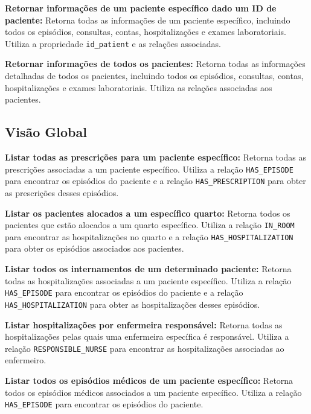 \vspace{0.15cm}
\textbf{Retornar informações de um paciente específico dado um ID de paciente:} Retorna todas as informações de um paciente específico, incluindo todos os episódios, consultas, contas, hospitalizações e exames laboratoriais. Utiliza a propriedade \texttt{id\_patient} e as relações associadas.

\vspace{0.15cm}
\textbf{Retornar informações de todos os pacientes:} Retorna todas as informações detalhadas de todos os pacientes, incluindo todos os episódios, consultas, contas, hospitalizações e exames laboratoriais. Utiliza as relações associadas aos pacientes.

\subsection{Visão Global}

\vspace{0.15cm}
\textbf{Listar todas as prescrições para um paciente específico:} Retorna todas as prescrições associadas a um paciente específico. Utiliza a relação \texttt{HAS\_EPISODE} para encontrar os episódios do paciente e a relação \texttt{HAS\_PRESCRIPTION} para obter as prescrições desses episódios.

\vspace{0.15cm}
\textbf{Listar os pacientes alocados a um específico quarto:} Retorna todos os pacientes que estão alocados a um quarto específico. Utiliza a relação \texttt{IN\_ROOM} para encontrar as hospitalizações no quarto e a relação \texttt{HAS\_HOSPITALIZATION} para obter os episódios associados aos pacientes.

\vspace{0.15cm}
\textbf{Listar todos os internamentos de um determinado paciente:} Retorna todas as hospitalizações associadas a um paciente específico. Utiliza a relação \texttt{HAS\_EPISODE} para encontrar os episódios do paciente e a relação \texttt{HAS\_HOSPITALIZATION} para obter as hospitalizações desses episódios.

\vspace{0.15cm}
\textbf{Listar hospitalizações por enfermeira responsável:} Retorna todas as hospitalizações pelas quais uma enfermeira específica é responsável. Utiliza a relação \texttt{RESPONSIBLE\_NURSE} para encontrar as hospitalizações associadas ao enfermeiro.

\vspace{0.15cm}
\textbf{Listar todos os episódios médicos de um paciente específico:} Retorna todos os episódios médicos associados a um paciente específico. Utiliza a relação \texttt{HAS\_EPISODE} para encontrar os episódios do paciente.

